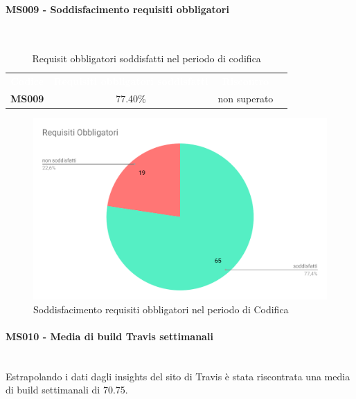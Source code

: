 \paragraph{MS009 - Soddisfacimento requisiti obbligatori}\mbox{}\\[0,3cm]
    \begin{table}[H]
        \centering
        \begin{tabular}{cccc}
        \rowcolor{greySWEight}
        \textcolor{white}{\textbf{Codice}} &
        \textcolor{white}{\textbf{Requisiti obbligatori soddisfatti}} &
        \textcolor{white}{\textbf{Riscontro}}\\
        \textbf{MS009}& 77.40\% & \textcolor{RubineRed}{non superato} \\

        \end{tabular}
        \caption{Requisit obbligatori soddisfatti nel periodo di codifica}
    \end{table}
    \begin{figure}[H]
        \centering
        \includegraphics[width=0.7\linewidth]{sez/App_Esito/Qualifica/graph/RequisitiObbligatori.pdf}
        \caption{Soddisfacimento requisiti obbligatori nel periodo di Codifica}
    \end{figure}

\paragraph{MS010 - Media di build Travis settimanali}\mbox{}\\[0,3cm]
    Estrapolando i dati dagli insights del sito di Travis è stata riscontrata una media di build settimanali di 70.75.

